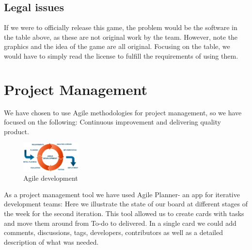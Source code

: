 \documentclass{article}
\renewcommand{\_}{\char`_}
\begin{document}
\subsection{Legal issues}
If we were to officially release this game, the problem would be the software in the table above,
as these are not original work by the team. However, note the graphics and the idea of the game are all original. Focusing on the table, we would have to simply read the license to fulfill the requirements of using them.

\clearpage
\section{Project Management}
We have chosen to use Agile methodologies for project management, so we have focused on the following: Continuous improvement and delivering quality product.

\begin{figure}[h!]
\includegraphics[width=3cm]{agile-development}
\centering
\caption{Agile development}
\end{figure}

As a project management tool we have used Agile Planner- an app for iterative development teams:
Here we illustrate the state of our board at different stages of the week for the second iteration.
This tool allowed us to create cards with tasks and move them around from To-do to delivered. In a single card we could add comments, discussions, tags, developers, contributors as well as a detailed description of what was needed.
\end{document}
